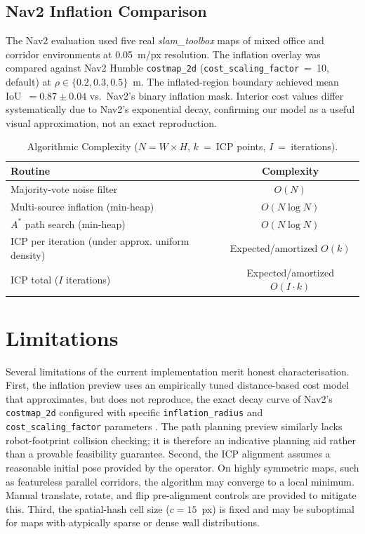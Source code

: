 \documentclass{IEEE_lsens}
\begin{document}
\subsection{Nav2 Inflation Comparison}
The Nav2 evaluation used five real \emph{slam\_toolbox} maps of mixed office and corridor environments at 0.05~m/px resolution. The inflation overlay was compared against Nav2 Humble \texttt{costmap\_2d} (\texttt{cost\_scaling\_factor}~=~10, default) at $\rho \in \{0.2,0.3,0.5\}$~m. The inflated-region boundary achieved mean IoU~$=0.87\pm0.04$ vs.\ Nav2's binary inflation mask. Interior cost values differ systematically due to Nav2's exponential decay, confirming our model as a useful visual approximation, not an exact reproduction.

\begin{table}[t]
\centering
\caption{Algorithmic Complexity ($N=W\!\times\!H$, $k$~=~ICP points, $I$~=~iterations).}
\label{tab:complexity}
\scriptsize
\renewcommand{\arraystretch}{1.0}
\begin{tabular}{@{}lc@{}}
\toprule
\textbf{Routine} & \textbf{Complexity} \\
\midrule
Majority-vote noise filter         & $O(N)$ \\
Multi-source inflation (min-heap)  & $O(N\log N)$ \\
$A^{*}$ path search (min-heap)     & $O(N\log N)$ \\
ICP per iteration (under approx. uniform density) & Expected/amortized $O(k)$ \\
ICP total ($I$ iterations)         & Expected/amortized $O(I\cdot k)$ \\
\bottomrule
\end{tabular}
\vspace{-2mm}
\end{table}

\section{Limitations}
\label{sec:limitations}
Several limitations of the current implementation merit honest characterisation. First, the inflation preview uses an empirically tuned distance-based cost model that approximates, but does not reproduce, the exact decay curve of Nav2's \texttt{costmap\_2d} configured with specific \texttt{inflation\_radius} and \texttt{cost\_scaling\_factor} parameters \cite{nav2docs}. The path planning preview similarly lacks robot-footprint collision checking; it is therefore an indicative planning aid rather than a provable feasibility guarantee. Second, the ICP alignment assumes a reasonable initial pose provided by the operator. On highly symmetric maps, such as featureless parallel corridors, the algorithm may converge to a local minimum. Manual translate, rotate, and flip pre-alignment controls are provided to mitigate this. Third, the spatial-hash cell size ($c=15$~px) is fixed and may be suboptimal for maps with atypically sparse or dense wall distributions.
\end{document}
